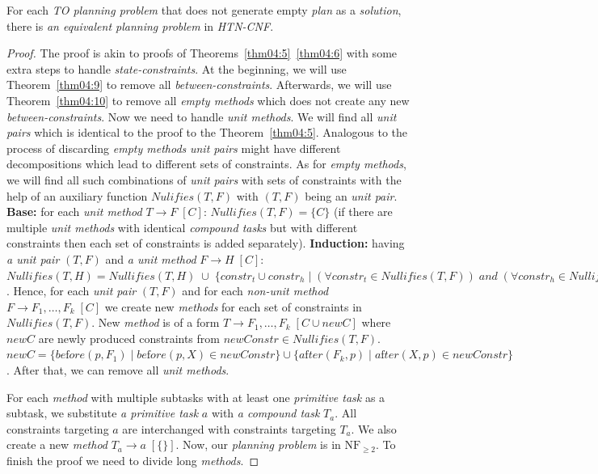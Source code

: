 \begin{thm}\label{thm04:12}
    For each \emph{TO planning problem} that does not generate empty \emph{plan} as a \emph{solution}, there is \emph{an equivalent planning problem} in \emph{HTN-CNF}.
\end{thm}
\begin{proof}
    The proof is akin to proofs of Theorems~\ref{thm04:5}~\ref{thm04:6} with some extra steps to handle \emph{state-constraints}. At the beginning, we will use Theorem~\ref{thm04:9} to remove all \emph{between-constraints}. Afterwards, we will use Theorem~\ref{thm04:10} to remove all \emph{empty methods} which does not create any new \emph{between-constraints}. Now we need to handle \emph{unit methods}. We will find all \emph{unit pairs} which is identical to the proof to the Theorem~\ref{thm04:5}. Analogous to the process of discarding \emph{empty methods} \emph{unit pairs} might have different decompositions which lead to different sets of constraints. As for \emph{empty methods}, we will find all such combinations of \emph{unit pairs} with sets of constraints with the help of an auxiliary function $Nulifies(T, F)$ with $(T, F)$ being an \emph{unit pair}. \textbf{Base:} for each \emph{unit method} $T \rightarrow F \; [C]$: $Nullifies(T, F) = \{C\}$ (if there are multiple \emph{unit methods} with identical \emph{compound tasks} but with different constraints then each set of constraints is added separately). \textbf{Induction:} having \emph{a unit pair} $(T, F)$ and \emph{a unit method} $F \rightarrow H \; [C]$: $Nullifies(T, H) = Nullifies(T, H) \; \cup \; \{constr_t \cup constr_h \; | \; (\forall constr_t \in Nullifies(T, F)) \; and \; (\forall constr_h \in Nullifies(F, H))\}$. Hence, for each \emph{unit pair} $(T, F)$ and for each \emph{non-unit method} $F \rightarrow F_1, \dots, F_k \; [C]$ we create new \emph{methods} for each set of constraints in $Nullifies(T, F)$. New \emph{method} is of a form $T \rightarrow F_1, \dots, F_k \; [C \cup newC]$ where $newC$ are newly produced constraints from $newConstr \in Nullifies(T, F)$. $newC = \{be\text{f}ore(p, F_1) \; | \; be\text{f}ore(p, X) \in newConstr\} \cup \{a\text{f}ter(F_k, p) \; | \; a\text{f}ter(X, p) \in newConstr\}$. After that, we can remove all \emph{unit methods}.

    For each \emph{method} with multiple subtasks with at least one \emph{primitive task} as a subtask, we substitute \emph{a primitive task} $a$ with \emph{a compound task} $T_a$. All constraints targeting $a$ are interchanged with constraints targeting $T_a$. We also create a new \emph{method} $T_a \rightarrow a \; [\{\}]$. Now, our \emph{planning problem} is in $\text{NF}_{\geq 2}$. To finish the proof we need to divide long \emph{methods}.


\end{proof}
